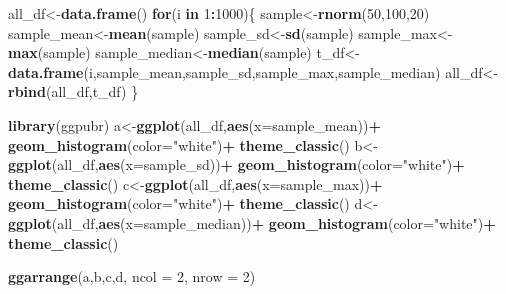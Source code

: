\documentclass[]{book}
\newenvironment{Shaded}{\begin{snugshade}}{\end{snugshade}}
\newcommand{\KeywordTok}[1]{\textcolor[rgb]{0.13,0.29,0.53}{\textbf{#1}}}
\newcommand{\DataTypeTok}[1]{\textcolor[rgb]{0.13,0.29,0.53}{#1}}
\newcommand{\DecValTok}[1]{\textcolor[rgb]{0.00,0.00,0.81}{#1}}
\newcommand{\StringTok}[1]{\textcolor[rgb]{0.31,0.60,0.02}{#1}}
\newcommand{\ControlFlowTok}[1]{\textcolor[rgb]{0.13,0.29,0.53}{\textbf{#1}}}
\newcommand{\OperatorTok}[1]{\textcolor[rgb]{0.81,0.36,0.00}{\textbf{#1}}}
\newcommand{\NormalTok}[1]{#1}
\begin{document}
\begin{Shaded}
\begin{Highlighting}[]
\NormalTok{all_df<-}\KeywordTok{data.frame}\NormalTok{()}
\ControlFlowTok{for}\NormalTok{(i }\ControlFlowTok{in} \DecValTok{1}\OperatorTok{:}\DecValTok{1000}\NormalTok{)\{}
\NormalTok{  sample<-}\KeywordTok{rnorm}\NormalTok{(}\DecValTok{50}\NormalTok{,}\DecValTok{100}\NormalTok{,}\DecValTok{20}\NormalTok{)}
\NormalTok{  sample_mean<-}\KeywordTok{mean}\NormalTok{(sample)}
\NormalTok{  sample_sd<-}\KeywordTok{sd}\NormalTok{(sample)}
\NormalTok{  sample_max<-}\KeywordTok{max}\NormalTok{(sample)}
\NormalTok{  sample_median<-}\KeywordTok{median}\NormalTok{(sample)}
\NormalTok{  t_df<-}\KeywordTok{data.frame}\NormalTok{(i,sample_mean,sample_sd,sample_max,sample_median)}
\NormalTok{  all_df<-}\KeywordTok{rbind}\NormalTok{(all_df,t_df)}
\NormalTok{\}}

\KeywordTok{library}\NormalTok{(ggpubr)}
\NormalTok{a<-}\KeywordTok{ggplot}\NormalTok{(all_df,}\KeywordTok{aes}\NormalTok{(}\DataTypeTok{x=}\NormalTok{sample_mean))}\OperatorTok{+}
\StringTok{  }\KeywordTok{geom_histogram}\NormalTok{(}\DataTypeTok{color=}\StringTok{"white"}\NormalTok{)}\OperatorTok{+}
\StringTok{  }\KeywordTok{theme_classic}\NormalTok{()}
\NormalTok{b<-}\KeywordTok{ggplot}\NormalTok{(all_df,}\KeywordTok{aes}\NormalTok{(}\DataTypeTok{x=}\NormalTok{sample_sd))}\OperatorTok{+}
\StringTok{  }\KeywordTok{geom_histogram}\NormalTok{(}\DataTypeTok{color=}\StringTok{"white"}\NormalTok{)}\OperatorTok{+}
\StringTok{  }\KeywordTok{theme_classic}\NormalTok{()}
\NormalTok{c<-}\KeywordTok{ggplot}\NormalTok{(all_df,}\KeywordTok{aes}\NormalTok{(}\DataTypeTok{x=}\NormalTok{sample_max))}\OperatorTok{+}
\StringTok{  }\KeywordTok{geom_histogram}\NormalTok{(}\DataTypeTok{color=}\StringTok{"white"}\NormalTok{)}\OperatorTok{+}
\StringTok{  }\KeywordTok{theme_classic}\NormalTok{()}
\NormalTok{d<-}\KeywordTok{ggplot}\NormalTok{(all_df,}\KeywordTok{aes}\NormalTok{(}\DataTypeTok{x=}\NormalTok{sample_median))}\OperatorTok{+}
\StringTok{  }\KeywordTok{geom_histogram}\NormalTok{(}\DataTypeTok{color=}\StringTok{"white"}\NormalTok{)}\OperatorTok{+}
\StringTok{  }\KeywordTok{theme_classic}\NormalTok{()}

\KeywordTok{ggarrange}\NormalTok{(a,b,c,d,}
          \DataTypeTok{ncol =} \DecValTok{2}\NormalTok{, }\DataTypeTok{nrow =} \DecValTok{2}\NormalTok{)}
\end{Highlighting}
\end{Shaded}
\end{document}
